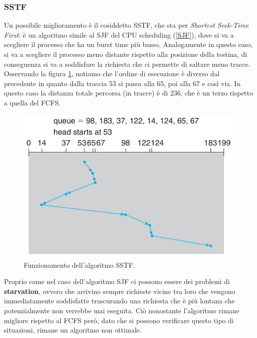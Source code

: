 \subsubsection{SSTF}
Un possibile miglioramento è il cosiddetto SSTF, che sta per \textit{Shortest Seek-Time First}: è un algoritmo simile al SJF del CPU scheduling (\ref{SJF}), dove si va a scegliere il processo che ha un burst time più basso. Analogamente in questo caso, si va a scegliere il processo meno distante rispetto alla posizione della testina, di conseguenza si va a soddisfare la richiesta che ci permette di saltare meno tracce. Osservando la figura \ref{fig:SSTF}, notiamo che l'ordine di esecuzione è diverso dal precedente in quanto dalla traccia 53 si passa alla 65, poi alla 67 e così via. In questo caso la distanza totale percorsa (in tracce) è di 236, che è un terzo rispetto a quella del FCFS.
\begin{figure}[h]
    \centering
    \includegraphics[width = .5\textwidth]{../res/imgs/mass memory/SSTF.png}
    \caption{Funzionamento dell'algoritmo SSTF.}
    \label{fig:SSTF}
\end{figure}
Proprio come nel caso dell'algoritmo SJF ci possono essere dei problemi di \textbf{starvation}, ovvero che arrivino sempre richieste vicine tra loro che vengono immediatamente soddisfatte trascurando una richiesta che è più lontana che potenzialmente non verrebbe mai eseguita. Ciò nonostante l'algoritmo rimane migliore rispetto al FCFS però, dato che si possono verificare questo tipo di situazioni, rimane un algoritmo non ottimale.

%

